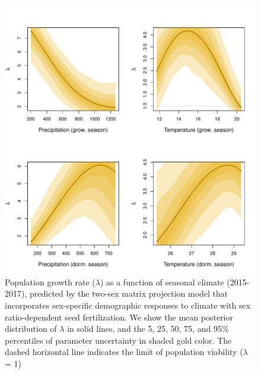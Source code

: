 \documentclass[12pt]{article}\usepackage[]{graphicx}\usepackage[dvipsnames]{xcolor}
\begin{document}
\begin{figure}[H]
  \begin{center}
    \includegraphics[width=0.95\linewidth]{Figures/lambda_CI.pdf}
  \caption{Population growth rate ($\lambda$) as a function of seasonal climate (2015-2017), predicted by the two-sex matrix projection model that incorporates sex-specific demographic responses to climate with sex ratio-dependent seed fertilization.
We show the mean posterior distribution of $\lambda$ in solid lines, and the 5, 25, 50, 75, and 95\% percentiles of parameter uncertainty in shaded gold color.
The dashed horizontal line indicates the limit of population viability ($\lambda$ = 1)}
  \label{Sup:lambda2sex}
  \end{center}
\end{figure}
\end{document}
